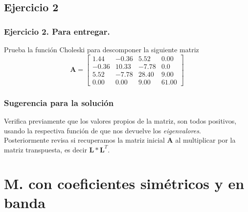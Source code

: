 \subsection*{Ejercicio 2}
\begin{frame}
\frametitle{Ejercicio 2. Para entregar.}
Prueba la función Choleski para descomponer la siguiente matriz
\begin{equation*}
\mathbf{A} =
\begin{bmatrix}
1.44 & -0.36 & 5.52 & 0.00 \\
-0.36 & 10.33 & -7.78 & 0.0 \\
5.52 & -7.78 & 28.40 & 9.00 \\
0.00 & 0.00 & 9.00 & 61.00 
\end{bmatrix}
\end{equation*}
\end{frame}
\begin{frame}
\frametitle{Sugerencia para la solución}
Verifica previamente que los valores propios de la matriz, son todos positivos, usando la respectiva función de \python{} que nos devuelve los \emph{eigenvalores}.
\\
\bigskip
\pause
Posteriormente revisa si recuperamos la matriz inicial $\mathbf{A}$ al multiplicar por la matriz transpuesta, es decir $\mathbf{L} * \mathbf{L}^{T}$.
\end{frame}
\section{M. con coeficientes simétricos y en banda}
